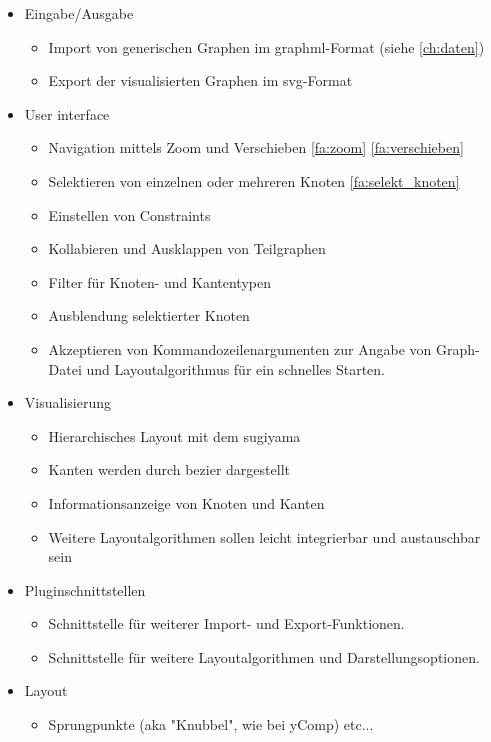 \begin{itemize}
  \item Eingabe/Ausgabe
  \begin{itemize}
    \item Import von generischen Graphen im \gls{graphml}-Format (siehe \ref{ch:daten})
    \item Export der visualisierten Graphen im \gls{svg}-Format
  \end{itemize}
  \item User interface
  \begin{itemize}
    \item Navigation mittels Zoom und Verschieben \ref{fa:zoom} \ref{fa:verschieben}
    \item Selektieren von einzelnen oder mehreren Knoten \ref{fa:selekt_knoten}
    \item Einstellen von Constraints
    \item Kollabieren und Ausklappen von Teilgraphen %
    \item Filter für Knoten- und Kantentypen
    \item Ausblendung selektierter Knoten
    \item Akzeptieren von Kommandozeilenargumenten zur Angabe von Graph-Datei und Layoutalgorithmus für ein schnelles Starten.
  \end{itemize}
  \item Visualisierung
  \begin{itemize}
    \item Hierarchisches Layout mit dem \gls{sugiyama}
    \item Kanten werden durch \gls{bezier} dargestellt
    \item Informationsanzeige von Knoten und Kanten
    \item Weitere Layoutalgorithmen sollen leicht integrierbar und austauschbar sein
  \end{itemize}
  \item Pluginschnittstellen
  \begin{itemize}
    \item Schnittstelle für weiterer Import- und Export-Funktionen. %
    \item Schnittstelle für weitere Layoutalgorithmen und Darstellungsoptionen.
  \end{itemize}
  \item Layout
  \begin{itemize}
    \item Sprungpunkte (aka "Knubbel", wie bei yComp) etc...
  \end{itemize}
\end{itemize}

